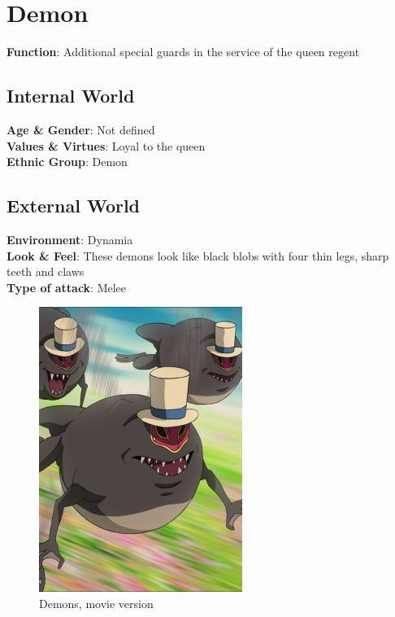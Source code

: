 \section{Demon}

\begin{minipage}{0.5\textwidth}
\textbf{Function}: Additional special guards in the service of the queen regent

\subsection{Internal World}

\textbf{Age \& Gender}: Not defined \\
\textbf{Values \& Virtues}: Loyal to the queen\\
\textbf{Ethnic Group}: Demon

\subsection{External World}
\textbf{Environment}: Dynamia \\
\textbf{Look \& Feel}: These demons look like black blobs with four thin legs, sharp teeth and claws \\
\textbf{Type of attack}: Melee \\
\end{minipage}%
%
\hfill\begin{minipage}{0.4\textwidth}
\begin{figure}[H]
 \includegraphics{Images/Enemies/demon_portrait}
  \caption{Demons, movie version}
  \end{figure}
\end{minipage}


